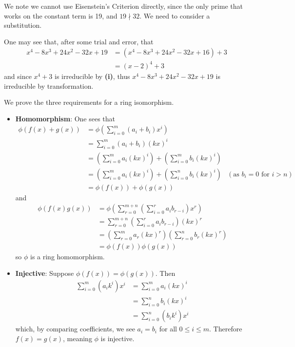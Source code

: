 \begin{questions}
\begin{partquestions}{\roman*}
        \item We note we cannot use Eisenstein's Criterion directly, since the only prime that works on the constant term is 19, and $19 \nmid 32$. We need to consider a substitution.

        One may see that, after some trial and error, that
        \begin{align*}
            x^4 - 8x^3 + 24x^2 - 32x + 19 &= (x^4 - 8x^3 + 24x^2 - 32x + 16) + 3\\
            &= (x - 2)^4 + 3
        \end{align*}
        and since $x^4 + 3$ is irreducible by \textbf{(i)}, thus $x^4 - 8x^3 + 24x^2 - 32x + 19$ is irreducible by transformation.
    \end{partquestions}

    \item We prove the three requirements for a ring isomorphism.
    \begin{itemize}
        \item \textbf{Homomorphism}: One sees that
        \begin{align*}
            \phi(f(x) + g(x)) &= \phi\left(\sum_{i=0}^m(a_i+b_i)x^i\right)\\
            &= \sum_{i=0}^m(a_i+b_i)(kx)^i\\
            &= \left(\sum_{i=0}^ma_i(kx)^i\right) + \left(\sum_{i=0}^mb_i(kx)^i\right)\\
            &= \left(\sum_{i=0}^ma_i(kx)^i\right) + \left(\sum_{i=0}^nb_i(kx)^i\right) & (\text{as } b_i = 0 \text{ for } i > n)\\
            &= \phi(f(x)) + \phi(g(x))
        \end{align*}
        and
        \begin{align*}
            \phi(f(x)g(x)) &= \phi\left(\sum_{r=0}^{m+n}\left(\sum_{i=0}^ra_ib_{r-i}\right)x^r\right)\\
            &= \sum_{r=0}^{m+n}\left(\sum_{i=0}^ra_ib_{r-i}\right)(kx)^r\\
            &= \left(\sum_{r=0}^ma_r(kx)^r\right)\left(\sum_{r=0}^nb_r(kx)^r\right)\\
            &= \phi(f(x))\phi(g(x))
        \end{align*}
        so $\phi$ is a ring homomorphism.

        \item \textbf{Injective}: Suppose $\phi(f(x)) = \phi(g(x))$. Then
        \begin{align*}
            \sum_{i=0}^m(a_ik^i)x^i &= \sum_{i=0}^ma_i(kx)^i\\
            &= \sum_{i=0}^nb_i(kx)^i\\
            &= \sum_{i=0}^n(b_ik^i)x^i
        \end{align*}
        which, by comparing coefficients, we see $a_i = b_i$ for all $0 \leq i \leq m$. Therefore $f(x) = g(x)$, meaning $\phi$ is injective.


\end{itemize}
\end{questions}
